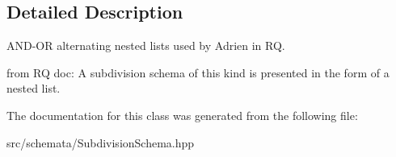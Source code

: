\subsection{Detailed Description}
A\+N\+D-\/\+OR alternating nested lists used by Adrien in RQ. 

from RQ doc\+: A subdivision schema of this kind is presented in the form of a nested list. 

The documentation for this class was generated from the following file\+:\begin{DoxyCompactItemize}
\item 
src/schemata/Subdivision\+Schema.\+hpp\end{DoxyCompactItemize}
